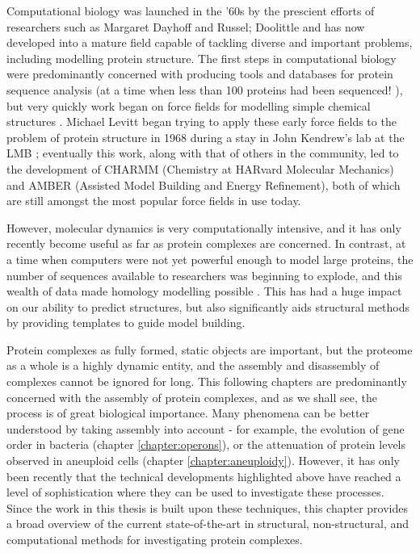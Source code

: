 \documentclass[a4paper,11pt,twoside,openright]{scrbook}
\begin{document}
Computational biology was launched in the '60s by the prescient efforts of researchers such as Margaret Dayhoff and Russel; Doolittle and has now developed into a mature field capable of tackling diverse and important problems, including modelling protein structure. The first steps in computational biology were predominantly concerned with producing tools and databases for protein sequence analysis (at a time when less than 100 proteins had been sequenced! \cite{Dayhoff1965}), but very quickly work began on force fields for modelling simple chemical structures \cite{Bixon1967}. Michael Levitt began trying to apply these early force fields to the problem of protein structure in 1968 during a stay in John Kendrew's lab at the LMB \cite{Levitt2001}; eventually this work, along with that of others in the community, led to the development of CHARMM \cite{Brooks2009} (Chemistry at HARvard Molecular Mechanics) and AMBER \cite{Salomon-Ferrer2013,Amber2017} (Assisted Model Building and Energy Refinement), both of which are still amongst the most popular force fields in use today.

However, molecular dynamics is very computationally intensive, and it has only recently become useful as far as protein complexes are concerned. In contrast, at a time when computers were not yet powerful enough to model large proteins, the number of sequences available to researchers was beginning to explode, and this wealth of data made homology modelling possible \cite{Rost1996,Xu1998}. This has had a huge impact on our ability to predict structures, but also significantly aids structural methods by providing templates to guide model building.

Protein complexes as fully formed, static objects are important, but the proteome as a whole is a highly dynamic entity, and the assembly and disassembly of complexes cannot be ignored for long. This following chapters are predominantly concerned with the assembly of protein complexes, and as we shall see, the process is of great biological importance. Many phenomena can be better understood by taking assembly into account - for example, the evolution of gene order in bacteria (chapter \ref{chapter:operons}), or the attenuation of protein levels observed in aneuploid cells (chapter \ref{chapter:aneuploidy}). However, it has only been recently that the technical developments highlighted above have reached a level of sophistication where they can be used to investigate these processes. Since the work in this thesis is built upon these techniques, this chapter provides a broad overview of the current state-of-the-art in structural, non-structural, and computational methods for investigating protein complexes.
\end{document}
